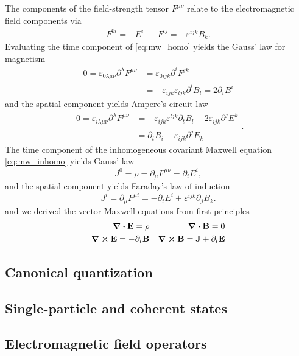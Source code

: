 The components of the field-strength tensor $F^{\mu\nu}$ relate to the electromagnetic field components via
\begin{align}
	F^{0i}
	=
	-E^i
	&&
	F^{ij}
	=
	-\varepsilon^{ijk}B_k
	\label{eq:mw_em_components}.
\end{align}
Evaluating the time component of \cref{eq:mw_homo} yields the Gauss' law for magnetism
\begin{equation}
	\begin{split}
		0
		=
		\varepsilon_{0\lambda\mu\nu}\partial^\lambda F^{\mu\nu}
		&=
		\varepsilon_{0ijk}\partial^iF^{jk}
		\\
		&=
		-
		\varepsilon_{ijk}\varepsilon_{ljk}
		\partial^i B_l
		=
		2\partial_iB^i
	\end{split}
	\label{eq:mw_gauss_law_mag}
\end{equation}
and the spatial component yields Ampere's circuit law
\begin{equation}
	\begin{split}
		0
		=
		\varepsilon_{i\lambda\mu\nu}
		\partial^\lambda
		F^{\mu\nu}
		&=
		-
		\varepsilon_{ijk}
		\varepsilon^{ljk}
		\partial_t B_l
		-
		2\varepsilon_{ijk}
		\partial^jE^k
		\\
		&=
		\partial_tB_i
		+
		\varepsilon_{ijk}
		\partial^jE_k
	\end{split}
	\label{eq:mw_ampere_law}.
\end{equation}
The time component of the inhomogeneous covariant Maxwell equation \cref{eq:mw_inhomo} yields Gauss' law
\begin{equation}
	J^0
	=
	\rho
	=
	\partial_\mu F^{\mu\nu}
	=
	\partial_i E^i
	\label{eq:mw_gauss_law},
\end{equation}
and the spatial component yields Faraday's law of induction
\begin{equation}
	J^i
	=
	\partial_\mu F^{\mu i}
	=
	-\partial_t E^i
	+\varepsilon^{ijk}\partial_j B_k
	\label{eq:mw_faraday_law}.
\end{equation}
and we derived the vector Maxwell equations from first principles
\begin{align}
	\div\vb{E}
	=
	\rho
	&&
	\div\vb{B}
	=
	0
	\label{eq:mw_homo_vec}
	\\
	\curl\vb{E}
	=
	-
	\partial_t\vb{B}
	&&
	\curl\vb{B}
	=
	\vb{J}
	+
	\partial_t\vb{E}
	\label{eq:mw_inhomo_vec}
\end{align}

\subsection{Canonical quantization}

\subsection{Single-particle and coherent states}

\subsection{Electromagnetic field operators}
